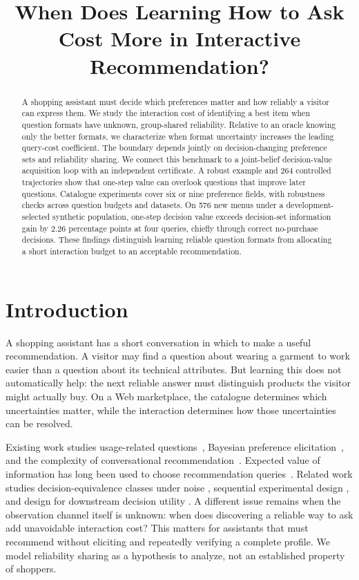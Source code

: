 \documentclass[sigconf,anonymous,review]{acmart}
\title{When Does Learning How to Ask Cost More in Interactive Recommendation?}
\begin{document}
\begin{abstract}
A shopping assistant must decide which preferences matter and how reliably a visitor can express them. We study the interaction cost of identifying a best item when question formats have unknown, group-shared reliability. Relative to an oracle knowing only the better formats, we characterize when format uncertainty increases the leading query-cost coefficient. The boundary depends jointly on decision-changing preference sets and reliability sharing. We connect this benchmark to a joint-belief decision-value acquisition loop with an independent certificate. A robust example and 264 controlled trajectories show that one-step value can overlook questions that improve later questions. Catalogue experiments cover six or nine preference fields, with robustness checks across question budgets and datasets. On 576 new menus under a development-selected synthetic population, one-step decision value exceeds decision-set information gain by 2.26 percentage points at four queries, chiefly through correct no-purchase decisions. These findings distinguish learning reliable question formats from allocating a short interaction budget to an acceptable recommendation.
\end{abstract}
\maketitle
\section{Introduction}
A shopping assistant has a short conversation in which to make a useful recommendation. A visitor may find a question about wearing a garment to work easier than a question about its technical attributes. But learning this does not automatically help: the next reliable answer must distinguish products the visitor might actually buy. On a Web marketplace, the catalogue determines which uncertainties matter, while the interaction determines how those uncertainties can be resolved.

Existing work studies usage-related questions~\cite{r8}, Bayesian preference elicitation~\cite{r7}, and the complexity of conversational recommendation~\cite{r4}. Expected value of information has long been used to choose recommendation queries~\cite{r1}. Related work studies decision-equivalence classes under noise \cite{r10,r11}, sequential experimental design \cite{r12}, and design for downstream decision utility \cite{r13}. A different issue remains when the observation channel itself is unknown: when does discovering a reliable way to ask add unavoidable interaction cost? This matters for assistants that must recommend without eliciting and repeatedly verifying a complete profile. We model reliability sharing as a hypothesis to analyze, not an established property of shoppers.
\end{document}
